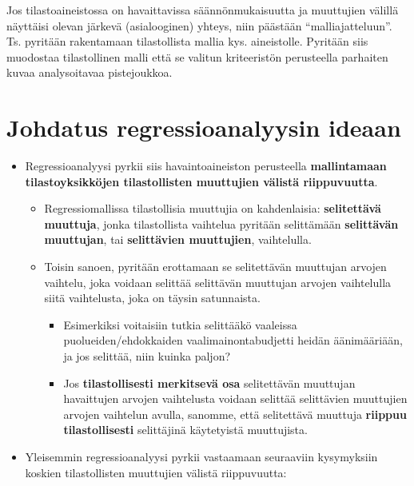 \documentclass[
]{book}
\providecommand{\tightlist}{%
  \setlength{\itemsep}{0pt}\setlength{\parskip}{0pt}}
\begin{document}
Jos tilastoaineistossa on havaittavissa säännönmukaisuutta ja muuttujien välillä näyttäisi olevan järkevä (asialooginen) yhteys, niin päästään ``malliajatteluun''. Ts. pyritään rakentamaan tilastollista mallia kys. aineistolle. Pyritään siis muodostaa tilastollinen malli että se valitun kriteeristön perusteella parhaiten kuvaa analysoitavaa pistejoukkoa.

\hypertarget{alaluku10}{%
\section{Johdatus regressioanalyysin ideaan}\label{alaluku10}}

\begin{itemize}
\tightlist
\item
  Regressioanalyysi pyrkii siis havaintoaineiston perusteella \textbf{mallintamaan tilastoyksikköjen tilastollisten muuttujien välistä riippuvuutta}.

  \begin{itemize}
  \tightlist
  \item
    Regressiomallissa tilastollisia muuttujia on kahdenlaisia: \textbf{selitettävä muuttuja}, jonka tilastollista vaihtelua pyritään selittämään \textbf{selittävän muuttujan}, tai \textbf{selittävien muuttujien}, vaihtelulla.
  \item
    Toisin sanoen, pyritään erottamaan se selitettävän muuttujan arvojen vaihtelu, joka voidaan selittää selittävän muuttujan arvojen vaihtelulla siitä vaihtelusta, joka on täysin satunnaista.

    \begin{itemize}
    \tightlist
    \item
      Esimerkiksi voitaisiin tutkia selittääkö vaaleissa puolueiden/ehdokkaiden vaalimainontabudjetti heidän äänimääriään, ja jos selittää, niin kuinka paljon?
    \item
      Jos \textbf{tilastollisesti merkitsevä osa} selitettävän muuttujan havaittujen arvojen vaihtelusta voidaan selittää selittävien muuttujien arvojen vaihtelun avulla, sanomme, että selitettävä muuttuja \textbf{riippuu tilastollisesti} selittäjinä käytetyistä muuttujista.
    \end{itemize}
  \end{itemize}
\item
  Yleisemmin regressioanalyysi pyrkii vastaamaan seuraaviin kysymyksiin koskien tilastollisten muuttujien välistä riippuvuutta:


\end{itemize}
\end{document}
